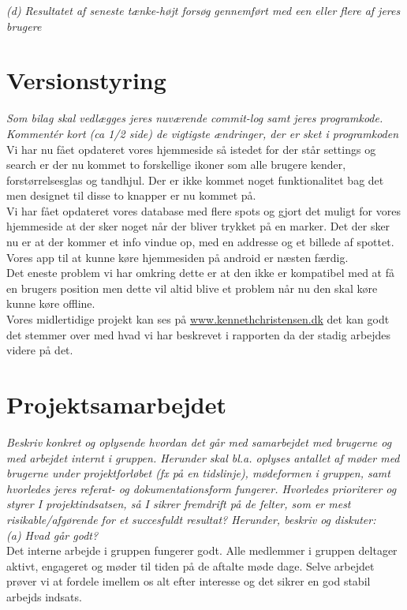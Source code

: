 \documentclass[12pt]{article}
\begin{document}
\textit{(d) Resultatet af seneste tænke-højt forsøg gennemført med een eller flere af jeres brugere}


\pagebreak
\section{Versionstyring}
\textit{Som bilag skal vedlægges jeres nuværende commit-log samt jeres
programkode. Kommentér kort (ca 1/2 side) de vigtigste ændringer, der er sket i programkoden}\\

Vi har nu fået opdateret vores hjemmeside så istedet for der står settings og search er der nu kommet to forskellige ikoner som alle brugere kender, forstørrelsesglas og tandhjul. Der er ikke kommet noget funktionalitet bag det men designet til disse to knapper er nu kommet på. \\
Vi har fået opdateret vores database med flere spots og gjort det muligt for vores hjemmeside at der sker noget når der bliver trykket på en marker. Det der sker nu er at der kommer et info vindue op, med en addresse og et billede af spottet.\\
Vores app til at kunne køre hjemmesiden på android er næsten færdig.\\
Det eneste problem vi har omkring dette er at den ikke er kompatibel med at få en brugers position men dette vil altid blive et problem når nu den skal køre kunne køre offline.\\
Vores midlertidige projekt kan ses på \url{www.kennethchristensen.dk} det kan godt det stemmer over med hvad vi har beskrevet i rapporten da der stadig arbejdes videre på det.\\

\pagebreak
\section{Projektsamarbejdet}
\textit{Beskriv konkret og oplysende hvordan det går med samarbejdet med brugerne
og med arbejdet internt i gruppen. Herunder skal bl.a. oplyses antallet af møder med brugerne under
projektforløbet (fx på en tidslinje), mødeformen i gruppen, samt hvorledes jeres referat- og
dokumentationsform fungerer. Hvorledes prioriterer og styrer I projektindsatsen, så I sikrer
fremdrift på de felter, som er mest risikable/afgørende for et succesfuldt resultat? Herunder, beskriv
og diskuter:}\\

\textit{(a) Hvad går godt?}\\
Det interne arbejde i gruppen fungerer godt. Alle medlemmer i gruppen deltager aktivt, engageret og møder til tiden på de aftalte møde dage. Selve arbejdet prøver vi at fordele imellem os alt efter interesse og det sikrer en god stabil arbejds indsats.\\
\end{document}
